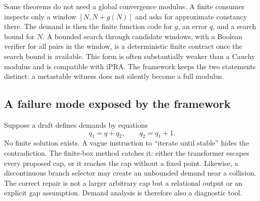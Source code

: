 Some theorems do not need a global convergence modulus.  A finite consumer inspects only a window
\([N,N+g(N)]\) and asks for approximate constancy there.  The demand is then the finite function code for
\(g\), an error \(q\), and a search bound for \(N\).  A bounded search through candidate windows, with a
Boolean verifier for all pairs in the window, is a deterministic finite contract once the search bound is
available.  This form is often substantially weaker than a Cauchy modulus and is compatible with iPRA.
The framework keeps the two statements distinct: a metastable witness does not silently become a full
modulus.

\subsection{A failure mode exposed by the framework}

Suppose a draft defines demands by equations
\[
 q_1=q+q_2,
 \qquad q_2=q_1+1.
\]
No finite solution exists.  A vague instruction to ``iterate until stable'' hides the contradiction.  The
finite-box method catches it: either the transformer escapes every proposed cap, or it reaches the cap
without a fixed point.  Likewise, a discontinuous branch selector may create an unbounded demand near a
collision.  The correct repair is not a larger arbitrary cap but a relational output or an explicit gap
assumption.  Demand analysis is therefore also a diagnostic tool.
